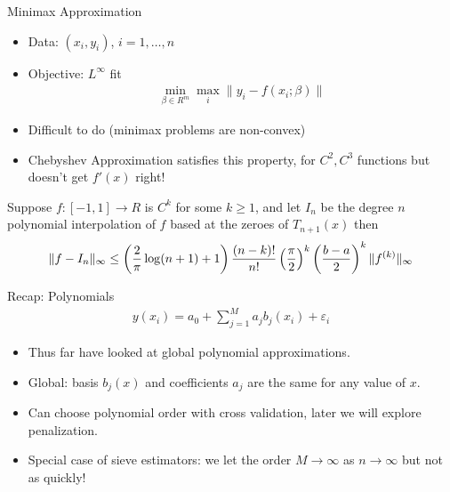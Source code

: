 \begin{frame}{Minimax Approximation}
\begin{itemize}
\item Data: $(x_i,y_i)$, $i=1,\ldots,n$
\item Objective: $L^{\infty}$ fit
\begin{eqnarray*}
\min_{\beta \in R^m} \max_{i} \| y_i - f(x_i; \beta) \|
\end{eqnarray*}
\item Difficult to do (minimax problems are non-convex)
\item Chebyshev Approximation satisfies this property, for $C^2,C^3$ functions but doesn't get $f'(x)$ right!
\end{itemize}
\begin{theorem}
Suppose $f: [-1,1] \rightarrow R$ is $C^k$ for some $k \geq 1$, and let $I_n$ be the degree $n$ polynomial interpolation of $f$ based at the zeroes of $T_{n+1}(x)$ then
\begin{eqnarray*}
\tiny
\| f - I_n \|_{\infty} \leq \left(\frac{2}{\pi}  \log(n+1) + 1 \right) \frac{(n-k)!}{n!} \left ( \frac{\pi}{2}\right)^k  \left ( \frac{b-a}{2}\right)^k \| f^{(k)} \|_{\infty}
\end{eqnarray*}
\end{theorem}
\end{frame}

\begin{frame}{Recap: Polynomials}
\begin{align*}
y(x_i) = a_0 + \sum_{j=1}^M a_j b_j(x_i) + \varepsilon_i
\end{align*}
\begin{itemize}
\item Thus far have looked at \alert{global polynomial approximations}.
\item Global: basis $b_j(x)$ and coefficients $a_j$ are the same for any value of $x$.
\item Can choose polynomial order with \alert{cross validation}, later we will explore \alert{penalization}.
\item Special case of \alert{sieve estimators}: we let the order $M \rightarrow \infty$ as $n \rightarrow \infty$ but not as quickly!
\end{itemize}
\end{frame}



